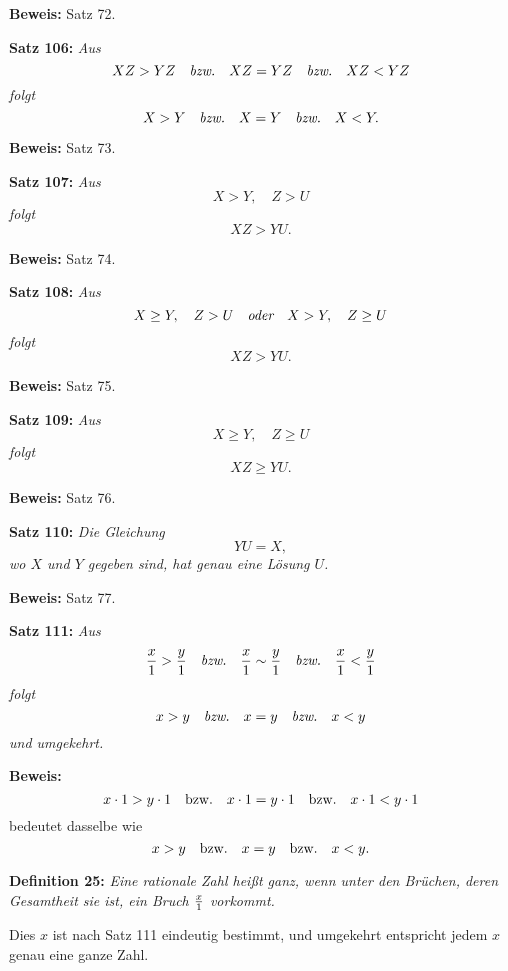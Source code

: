 {\bf Beweis:} Satz 72.
\medskip


{\bf Satz 106:} {\it Aus
$$XZ > YZ\quad\hbox{\it bzw.}\quad XZ = YZ\quad\hbox{\it bzw.}\quad XZ < YZ$$
folgt
$$X > Y\quad\hbox{\it bzw.}\quad X = Y\quad\hbox{\it bzw.}\quad X < Y.$$}%

{\bf Beweis:} Satz 73.
\medskip


{\bf Satz 107:} {\it Aus
$$X > Y,\quad Z > U$$
folgt
$$XZ > YU.$$}%

{\bf Beweis:} Satz 74.
\medskip


{\bf Satz 108:} {\it Aus
$$X \ge Y,\quad Z > U\quad\hbox{\it oder}\quad X > Y,\quad Z \ge U$$
folgt
$$XZ > YU.$$}%

{\bf Beweis:} Satz 75.
\medskip


{\bf Satz 109:} {\it Aus
$$X \ge Y,\quad Z \ge U$$
folgt
$$XZ \ge YU.$$}%

{\bf Beweis:} Satz 76.
\medskip


{\bf Satz 110:} {\it Die Gleichung
$$YU = X,$$
wo $X$ und $Y$ gegeben sind, hat genau eine L\"osung $U$.}

{\bf Beweis:} Satz 77.
\medskip


{\bf Satz 111:} {\it Aus
$${x \over 1} > {y \over 1}\quad\hbox{\it bzw.}\quad{x \over 1} \sim {y \over 1}\quad\hbox{\it bzw.}\quad{x \over 1} < {y \over 1}$$
folgt
$$x > y\quad\hbox{\it bzw.}\quad x = y\quad\hbox{\it bzw.}\quad x < y$$
und umgekehrt.}

{\bf Beweis:} $$x \cdot 1 > y \cdot 1\quad\hbox{\rm bzw.}\quad x \cdot 1 = y \cdot 1\quad\hbox{\rm bzw.}\quad x \cdot 1 < y \cdot 1$$
bedeutet dasselbe wie
$$x > y\quad\hbox{\rm bzw.}\quad x = y\quad\hbox{\rm bzw.}\quad x < y.$$
\medskip


{\bf Definition 25:} {\it Eine rationale Zahl hei{\ss}t ganz, wenn unter den
Br\"uchen, deren Gesamtheit sie ist, ein Bruch $x \over 1$ vorkommt.}

Dies $x$ ist nach Satz 111 eindeutig bestimmt, und umgekehrt
entspricht jedem $x$ genau eine ganze Zahl.
\medskip


